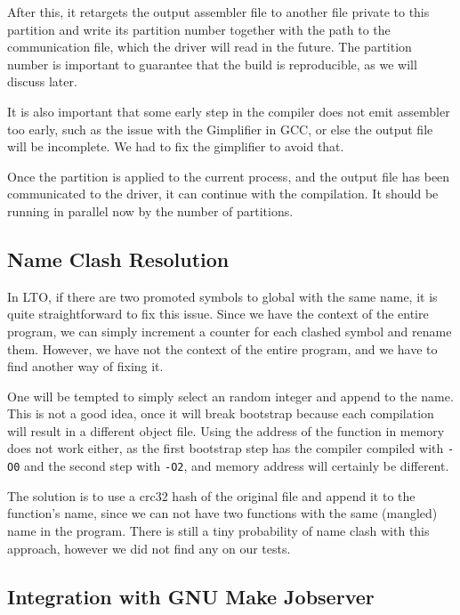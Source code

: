\documentclass[runningheads]{llncs}
\begin{document}
After this, it retargets the output assembler file to another file private to
this partition and write its partition number together with the path to the
communication file, which the driver will read in the future. The partition
number is important to guarantee that the build is reproducible, as we will
discuss later.

It is also important that some early step in the compiler does not emit assembler
too early, such as the issue with the Gimplifier in GCC, or else the output
file will be incomplete. We had to fix the gimplifier to avoid that.

Once the partition is applied to the current process, and the output file has
been communicated to the driver, it can continue with the compilation. It
should be running in parallel now by the number of partitions.

\subsection{Name Clash Resolution}\label{sec:name_clash_resolution}

In LTO, if there are two promoted symbols to global with the same name, it is
quite straightforward to fix this issue. Since we have the context of the
entire program, we can simply increment a counter for each clashed symbol and
rename them. However, we have not the context of the entire program, and we
have to find another way of fixing it.

One will be tempted to simply select an random integer and append to the name.
This is not a good idea, once it will break bootstrap because each
compilation will result in a different object file. Using the address of the
function in memory does not work either, as the first bootstrap step has the
compiler compiled with \texttt{-O0} and the second step with \texttt{-O2}, and
memory address will certainly be different.

The solution is to
use a crc32 hash of the original file and append it to the function's name,
since we can not have two functions with the same (mangled) name in the program.
There is still a tiny probability of name clash with this approach, however we did
not find any on our tests.

\subsection{Integration with GNU Make Jobserver}\label{sec:integration_jobserver}
\end{document}
